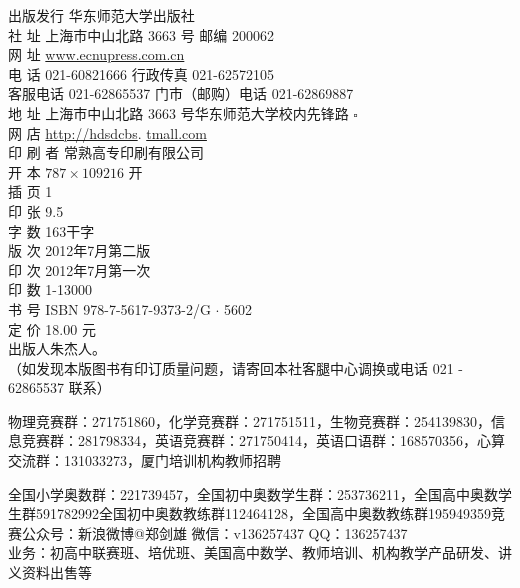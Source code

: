 \documentclass[10pt]{article}
\begin{document}
出版发行 华东师范大学出版社\\
社 址 上海市中山北路 3663 号 邮编 200062\\
网 址 \href{http://www.ecnupress.com.cn}{www.ecnupress.com.cn}\\
电 话 021-60821666 行政传真 021-62572105\\
客服电话 021-62865537 门市（邮购）电话 021-62869887\\
地 址 上海市中山北路 3663 号华东师范大学校内先锋路 $\square$\\
网 店 \href{http://hdsdcbs}{http://hdsdcbs}. \href{http://tmall.com}{tmall.com}\\
印 刷 者 常熟高专印刷有限公司\\
开 本 $787 \times 109216$ 开\\
插 页 1\\
印 张 9.5\\
字 数 163干字\\
版 次 2012年7月第二版\\
印 次 2012年7月第一次\\
印 数 1-13000\\
书 号 ISBN 978-7-5617-9373-2/G $\cdot$ 5602\\
定 价 18.00 元\\
出版人朱杰人。\\
（如发现本版图书有印订质量问题，请寄回本社客腿中心调换或电话 021 - 62865537 联系）

物理竞赛群：271751860，化学竞赛群：271751511，生物竞赛群：254139830，信息竞赛群：281798334，英语竞赛群：271750414，英语口语群：168570356，心算交流群：131033273，厦门培训机构教师招聘

全国小学奥数群：221739457，全国初中奥数学生群：253736211，全国高中奥数学生群591782992全国初中奥数教练群112464128，全国高中奥数教练群195949359竞赛公众号：新浪微博@郑剑雄 微信：v136257437 QQ：136257437\\
业务：初高中联赛班、培优班、美国高中数学、教师培训、机构教学产品研发、讲义资料出售等
\end{document}

